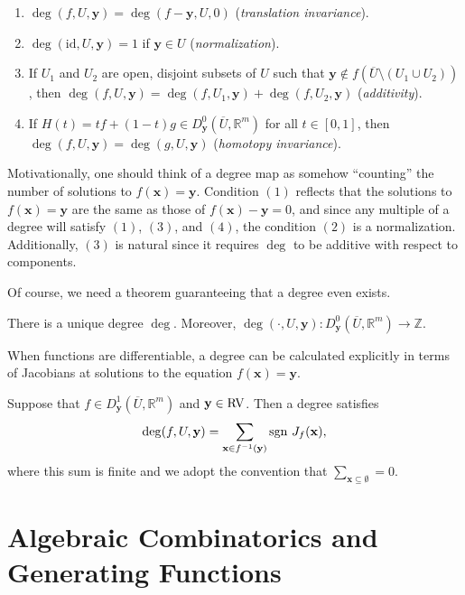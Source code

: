 
\begin{enumerate}
\item $\deg(f,U,\mathbf{y}) = \deg(f-\mathbf y, U, 0)$ (\textit{translation invariance}).
\item $\deg(\mathrm{id}, U, \mathbf y) = 1$ if $\mathbf y \in U$ (\textit{normalization}).
\item If $U_1$ and $U_2$ are open, disjoint subsets of $U$ such that $\mathbf  y \notin f(\overline{U} \setminus (U_1 \cup U_2))$, then $\deg(f,U,\mathbf y) = \deg(f,U_1,\mathbf y) +\deg(f,U_2,\mathbf y)$ (\textit{additivity}). 
\item If $H(t) = tf + (1-t)g \in D^{0}_{\mathbf{y}}(\overline{U},\mathbb R^m)$ for all $t \in [0,1]$, then $\deg(f,U,\mathbf y) = \deg(g,U,\mathbf y)$ (\textit{homotopy invariance}).
\end{enumerate}

Motivationally, one should think of a degree map as somehow ``counting'' the number of solutions to $f(\mathbf x) = \mathbf y$.  Condition $(1)$ reflects that the solutions to $f(\mathbf x) = \mathbf y$ are the same as those of $f(\mathbf x)- \mathbf y = 0$, and since any multiple of a degree will satisfy $(1)$, $(3)$, and $(4)$, the condition $(2)$ is a normalization.  Additionally, $(3)$ is natural since it requires $\deg$ to be additive with respect to components.  

Of course, we need a theorem guaranteeing that a degree even exists.

\begin{theorem}
There is a unique degree $\deg$.  Moreover, $\deg(\cdot, U, \mathbf y):  D^0_{\mathbf{y}}(\overline{U},\mathbb R^m) \to \mathbb Z$.
\end{theorem}

When functions are differentiable, a degree can be calculated explicitly in terms of Jacobians at solutions to the equation $f(\mathbf x) = \mathbf y$.

\begin{theorem}\label{sumjacob}
Suppose that $f \in D^1_{\mathbf y}(\overline{U},\mathbb R^m)$ and $\mathbf y \in \text{\rm{RV}}$.  Then a degree satisfies \[\deg(f,U,\mathbf y) = \sum_{\mathbf x \in f^{-1}(\mathbf y)} {\text{\rm{sgn}} \  J_f(\mathbf x)},\] where this sum is finite and we adopt the convention that $\sum_{\mathbf x \subseteq  \emptyset} = 0$.
\end{theorem}


\section{Algebraic Combinatorics and Generating Functions}




